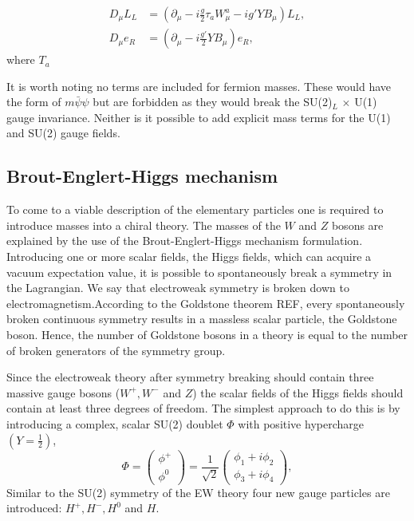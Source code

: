 \begin{equation*}
\begin{split}
D_\mu L_L &= \left(\partial_\mu - i\frac{g}{2} \tau_a W^a_\mu - i g' Y B_\mu \right) L_L, \\
D_\mu e_R &= \left(\partial_\mu - i\frac{g'}{2} Y B_\mu\right)e_R,
\end{split}
\end{equation*}
\noindent where $T_a$


It is worth noting no terms are included for fermion masses. These would have the form of $m\bar{\psi}\psi$ but are forbidden as they would break the SU(2)$_L$ $\times$ U(1) gauge invariance. Neither is it possible to add explicit mass terms for the U(1) and SU(2) gauge fields. 
\subsection{Brout-Englert-Higgs mechanism}
\label{subsec:BEH}
To come to a viable description of the elementary particles one is required to introduce masses into a chiral theory. The masses of the $W$ and $Z$ bosons are explained by the use of the Brout-Englert-Higgs mechanism formulation. Introducing one or more scalar fields, the Higgs fields, which can acquire a vacuum expectation value, it is possible to spontaneously break a symmetry in the Lagrangian. We say that electroweak symmetry is broken down to electromagnetism.According to the Goldstone theorem REF, every spontaneously broken continuous symmetry results in a massless scalar particle, the Goldstone boson. Hence, the number of Goldstone bosons in a theory is equal to the number of broken generators of the symmetry group.

Since the electroweak theory after symmetry breaking should contain three massive gauge bosons ($W^+, W^-$ and $Z$) the scalar fields of the Higgs fields should contain at least three degrees of freedom. The simplest approach to do this is by introducing a complex, scalar SU(2) doublet $\Phi$ with positive hypercharge $\left(Y=\frac{1}{2}\right)$,
\begin{equation}
\label{eq:higgsdoublet}
\Phi = \begin{pmatrix} \phi^+ \\ \phi^0 \end{pmatrix} = \frac{1}{\sqrt{2}} \begin{pmatrix} \phi_1 + i\phi_2 \\ \phi_3 + i\phi_4 \end{pmatrix},
\end{equation}
Similar to the SU(2) symmetry of the EW theory four new gauge particles are introduced: $H^+, H^-, H^0$ and $H$.


